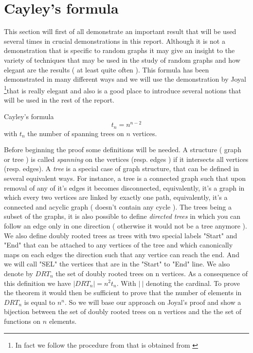 \section{Cayley's formula}
This section will first of all demonstrate an important result that will be used several times in crucial demonstrations in this report. Although it is not a demonstration that is specific to random graphs it may give an insight to the variety of techniques that may be used in the study of random graphs and how elegant are the results ( at least quite often ). This formula has been demonstrated in many different ways and we will use the demonstration by Joyal \cite{joyal} \footnote{In fact we follow the procedure from \cite{JoyalProof} that is obtained from \cite{joyal} }that is really elegant and also is a good place to introduce several notions that will be used in the rest of the report. 
\begin{theorem}{Cayley's formula}
\begin{equation}
    t_n = n^{n-2}
\end{equation}
with $t_n$ the number of spanning trees on $n$ vertices.
\end{theorem}
Before beginning the proof some definitions will be needed. A structure ( graph or tree ) is called \emph{spanning} on the vertices (resp. edges ) if it intersects all vertices (resp. edges). 
A \emph{tree} is a special case of graph structure, that can be defined in several equivalent ways. For instance, a tree is a connected graph such that upon removal of any of it's edges it becomes disconnected, equivalently, it's a graph in which every two vertices are linked by exactly one path, equivalently, it's a connected and acyclic graph ( doesn't contain any cycle ).
\newline 
The trees being a subset of the graphs, it is also possible to define \emph{directed trees} in which you can follow an edge only in one direction ( otherwise it would not be a tree anymore ).
We also define doubly rooted trees as trees with two special labels "Start" and "End" that can be attached to any vertices of the tree and which canonically maps on each edges the direction such that any vertice can reach the end. And we will call "SEL" the vertices that are in the "Start" to "End" line. 
We also denote by $DRT_n$ the set of doubly rooted trees on n vertices.
\newline
As a consequence of this definition we have $|DRT_n| = n^2 t_n$. With $|\ |$ denoting the cardinal. 
To prove the theorem it would then be sufficient to prove that the number of elements in $DRT_n$ is equal to $n^n$. So we will base our approach on Joyal's proof and show a bijection between the set of doubly rooted trees on n vertices and the the set of functions on $n$ elements.
